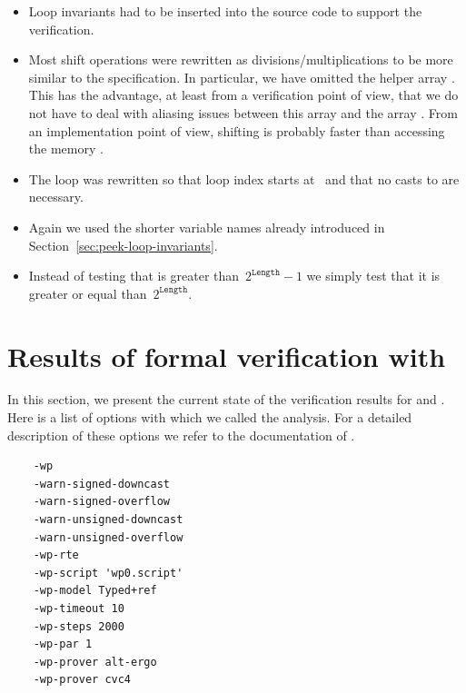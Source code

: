 \begin{itemize}
\item Loop invariants had to be inserted into
      the source code to support the verification.

\item Most shift operations were rewritten as divisions\slash multiplications
      to be more similar to the specification. 
      In particular, we have omitted the helper array .
      This has the advantage, at least from a verification point of view,
      that we do not have to deal with aliasing issues between this array
      and the array .
      From an implementation point of view, shifting is probably faster
      than accessing the memory .

\item The loop was rewritten so that loop index starts at~
      and that no casts to  are necessary.

\item Again we used the shorter variable names already introduced in
      Section~\ref{sec:peek-loop-invariants}.

\item Instead of testing that  is greater than~$2^\mathtt{Length} - 1$
      we simply test that it is greater or equal than~$2^\mathtt{Length}$.

\end{itemize}


\clearpage

\section{Results of formal verification with \framacwp}
\label{sec:verification-results}

In this section, we present the current state of the verification results 
for \peek and \poke.
Here is a list of options with which we called the \framacwp analysis.
For a detailed description of these options we refer to the documentation
of \framac.

\begin{verbatim}
    -wp
    -warn-signed-downcast
    -warn-signed-overflow
    -warn-unsigned-downcast
    -warn-unsigned-overflow
    -wp-rte
    -wp-script 'wp0.script'
    -wp-model Typed+ref
    -wp-timeout 10
    -wp-steps 2000
    -wp-par 1
    -wp-prover alt-ergo
    -wp-prover cvc4
\end{verbatim}

